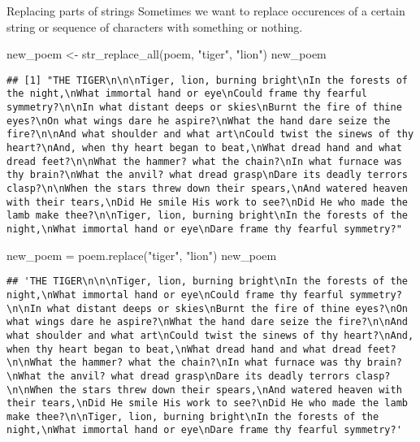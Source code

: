 \documentclass[
  10pt,
  ignorenonframetext,
  aspectratio=169]{beamer}
\newenvironment{Shaded}{\begin{snugshade}}{\end{snugshade}}
\newcommand{\FunctionTok}[1]{\textcolor[rgb]{0.94,0.94,0.56}{#1}}
\newcommand{\NormalTok}[1]{\textcolor[rgb]{0.80,0.80,0.80}{#1}}
\newcommand{\OperatorTok}[1]{\textcolor[rgb]{0.94,0.94,0.82}{#1}}
\newcommand{\OtherTok}[1]{\textcolor[rgb]{0.94,0.94,0.56}{#1}}
\newcommand{\StringTok}[1]{\textcolor[rgb]{0.80,0.58,0.58}{#1}}
\begin{document}
\begin{frame}[fragile]{Replacing parts of strings}
\protect\hypertarget{replacing-parts-of-strings}{}
Sometimes we want to replace occurences of a certain string or sequence
of characters with something or nothing.

\medskip

\scriptsize

\begin{Shaded}
\begin{Highlighting}[]
\NormalTok{new\_poem }\OtherTok{\textless{}{-}} \FunctionTok{str\_replace\_all}\NormalTok{(poem, }\StringTok{"tiger"}\NormalTok{, }\StringTok{"lion"}\NormalTok{)}
\NormalTok{new\_poem}
\end{Highlighting}
\end{Shaded}

\begin{verbatim}
## [1] "THE TIGER\n\n\nTiger, lion, burning bright\nIn the forests of the night,\nWhat immortal hand or eye\nCould frame thy fearful symmetry?\n\nIn what distant deeps or skies\nBurnt the fire of thine eyes?\nOn what wings dare he aspire?\nWhat the hand dare seize the fire?\n\nAnd what shoulder and what art\nCould twist the sinews of thy heart?\nAnd, when thy heart began to beat,\nWhat dread hand and what dread feet?\n\nWhat the hammer? what the chain?\nIn what furnace was thy brain?\nWhat the anvil? what dread grasp\nDare its deadly terrors clasp?\n\nWhen the stars threw down their spears,\nAnd watered heaven with their tears,\nDid He smile His work to see?\nDid He who made the lamb make thee?\n\nTiger, lion, burning bright\nIn the forests of the night,\nWhat immortal hand or eye\nDare frame thy fearful symmetry?"
\end{verbatim}

\begin{Shaded}
\begin{Highlighting}[]
\NormalTok{new\_poem }\OperatorTok{=}\NormalTok{ poem.replace(}\StringTok{"tiger"}\NormalTok{, }\StringTok{"lion"}\NormalTok{)}
\NormalTok{new\_poem}
\end{Highlighting}
\end{Shaded}

\begin{verbatim}
## 'THE TIGER\n\n\nTiger, lion, burning bright\nIn the forests of the night,\nWhat immortal hand or eye\nCould frame thy fearful symmetry?\n\nIn what distant deeps or skies\nBurnt the fire of thine eyes?\nOn what wings dare he aspire?\nWhat the hand dare seize the fire?\n\nAnd what shoulder and what art\nCould twist the sinews of thy heart?\nAnd, when thy heart began to beat,\nWhat dread hand and what dread feet?\n\nWhat the hammer? what the chain?\nIn what furnace was thy brain?\nWhat the anvil? what dread grasp\nDare its deadly terrors clasp?\n\nWhen the stars threw down their spears,\nAnd watered heaven with their tears,\nDid He smile His work to see?\nDid He who made the lamb make thee?\n\nTiger, lion, burning bright\nIn the forests of the night,\nWhat immortal hand or eye\nDare frame thy fearful symmetry?'
\end{verbatim}
\end{frame}
\end{document}
